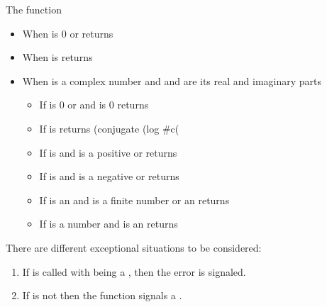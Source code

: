 \documentclass[../Comparisons-Predicates.tex]{subfiles}
\begin{document}
    \noindent
    The function 
    \begin{itemize}
        \item When  is $0$ or  returns
        \item When  is  returns
        \item When  is a complex number and  and
         are its real and imaginary parts
        \begin{itemize}
            \item If  is $0$ or  and
             is $0$ returns  \code{)))}
            \item If  is  returns \code
            {(conjugate (log \#c(} 
            \item If  is  and  is a
            positive  or  returns
             
            \item If  is  and  is a
            negative  or  returns
             
            \item If  is an  and 
            is a finite number or an  returns
            \code{)))}
            \item If  is a  number and 
            is an  returns
             \code{)))}
        \end{itemize}
    \end{itemize}


    \DExceptional{}

    There are different exceptional situations to be considered:
    \begin{enumerate}
        \item If  is called with
         being a , then the
         error is signaled.
        \item If  is not \CL{}
         then the function  signals a
        .
    \end{enumerate}
\end{document}
